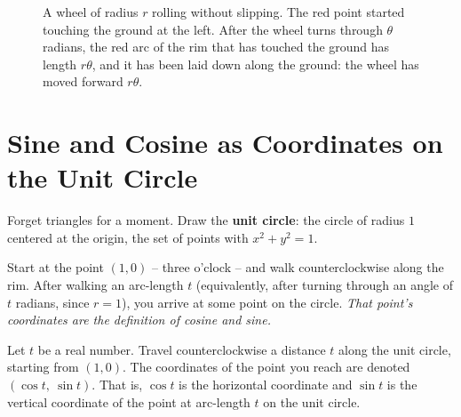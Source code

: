 \begin{figure}[htbp]
\centering
{}
\caption{A wheel of radius $r$ rolling without slipping. The red point started touching the ground at the left. After the wheel turns through $\theta$ radians, the red arc of the rim that has touched the ground has length $r\theta$, and it has been laid down along the ground: the wheel has moved forward $r\theta$.}
\label{ch04:fig-rolling-wheel}
\end{figure}

\section{Sine and Cosine as Coordinates on the Unit Circle}
\label{ch04:unit-circle}

Forget triangles for a moment. Draw the \textbf{unit circle}: the circle of radius $1$ centered at the origin, the set of points with $x^2 + y^2 = 1$.

Start at the point $(1,0)$ -- three o'clock -- and walk counterclockwise along the rim. After walking an arc-length $t$ (equivalently, after turning through an angle of $t$ radians, since $r=1$), you arrive at some point on the circle. \emph{That point's coordinates are the definition of cosine and sine.}

\begin{definition}
\label{ch04:def-sincos}
Let $t$ be a real number. Travel counterclockwise a distance $t$ along the unit circle, starting from $(1,0)$. The coordinates of the point you reach are denoted $(\cos t,\ \sin t)$. That is, $\cos t$ is the horizontal coordinate and $\sin t$ is the vertical coordinate of the point at arc-length $t$ on the unit circle.
\end{definition}

